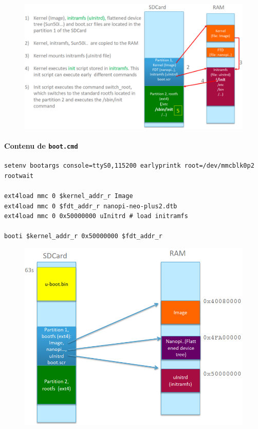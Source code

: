 \documentclass[resume]{subfiles}
\begin{document}
\begin{figure}[H]
    \centering
    \includegraphics[width=1\columnwidth]{Figures/fileSystem/initRamFsBootSeq2.png}
    \label{fig:initRamFsBootSeq2}
\end{figure}

\paragraph{Contenu de \texttt{boot.cmd}}
\begin{lstlisting}[style=bash]
setenv bootargs console=ttyS0,115200 earlyprintk root=/dev/mmcblk0p2 rootwait

ext4load mmc 0 $kernel_addr_r Image
ext4load mmc 0 $fdt_addr_r nanopi-neo-plus2.dtb
ext4load mmc 0 0x50000000 uInitrd # load initramfs

booti $kernel_addr_r 0x50000000 $fdt_addr_r
\end{lstlisting}

\begin{figure}[H]
    \centering
    \includegraphics[width=1\columnwidth]{Figures/fileSystem/initRamFsBootSeq4.png}
    \label{fig:initRamFsBootSeq4}
\end{figure}
\end{document}
